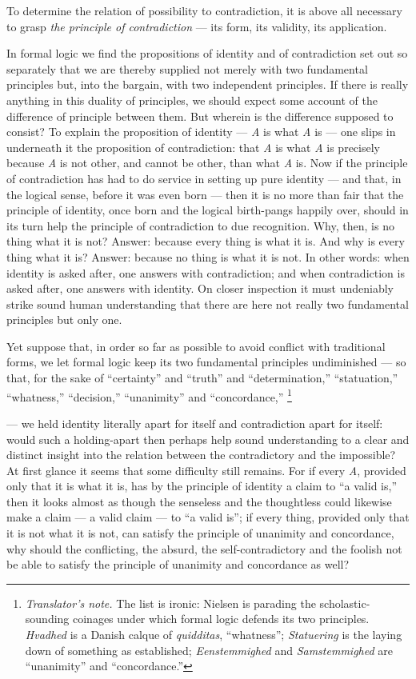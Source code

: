 \documentclass[12pt,a4paper]{book}
\renewcommand{\thefootnote}{\ifcase\value{footnote}\or *)\or **)\or ***)\fi}
\newcommand{\tnote}[1]{%
  \begingroup
  \renewcommand{\thefootnote}{\textdagger}%
  \footnote{\emph{Translator's note.} #1}%
  \addtocounter{footnote}{-1}%
  \endgroup}
\begin{document}
To determine the relation of possibility to contradiction, it is above all
necessary to grasp \emph{the principle of contradiction} --- its form, its
validity, its application.

In formal logic we find the propositions of identity and of contradiction set
out so separately that we are thereby supplied not merely with two fundamental
principles but, into the bargain, with two independent principles. If there is
really anything in this duality of principles, we should expect some account of
the difference of principle between them. But wherein is the difference
supposed to consist? To explain the proposition of identity --- \textit{A} is
what \textit{A} is --- one slips in underneath it the proposition of
contradiction: that \textit{A} is
what \textit{A} is precisely because \textit{A} is not other, and cannot be
other, than what \textit{A} is. Now if the principle of contradiction has had
to do service in setting up pure identity --- and that, in the logical sense,
before it was even born --- then it is no more than fair that the principle of
identity, once born and the logical birth-pangs happily over, should in its
turn help the principle of contradiction to due recognition. Why, then, is no
thing what it is not? Answer: because every thing is what it is. And why is
every thing what it is? Answer: because no thing is what it is not. In other
words: when identity is asked after, one answers with contradiction; and when
contradiction is asked after, one answers with identity. On closer inspection
it must undeniably strike sound human understanding that there are here not
really two fundamental principles but only one.

Yet suppose that, in order so far as possible to avoid conflict with
traditional forms, we let formal logic keep its two fundamental principles
undiminished --- so that, for the sake of ``certainty'' and ``truth'' and
``determination,'' ``statuation,'' ``whatness,'' ``decision,'' ``unanimity''
and ``concordance,''\tnote{The list is ironic: Nielsen is parading the
scholastic-sounding coinages under which formal logic defends its two
principles. \emph{Hvadhed} is a Danish calque of \textit{quidditas},
``whatness''; \emph{Statuering} is the laying down of something as established;
\emph{Eenstemmighed} and \emph{Samstemmighed} are ``unanimity'' and
``concordance.''} --- we held identity literally apart for itself and
contradiction apart for itself: would such a holding-apart then perhaps help
sound understanding to a clear and distinct insight into the relation between
the contradictory and the impossible? At first glance it seems that some
difficulty still remains. For if every \textit{A}, provided only that it is
what it is, has by the principle of identity a claim to ``a valid is,'' then it
looks almost as though the senseless and the thoughtless could likewise make a
claim --- a valid claim --- to ``a valid is''; if every thing, provided only
that it is not what it is not, can satisfy the principle of unanimity and
concordance, why should the conflicting, the absurd, the self-contradictory and
the foolish
not be able to satisfy the principle of unanimity and concordance as well?
\end{document}
